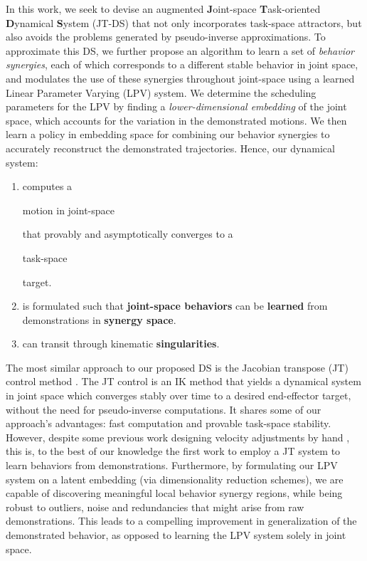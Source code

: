 \documentclass[letterpaper, 10 pt, conference,fleqn]{ieeeconf}
\begin{document}
In this work, we seek to devise an augmented \textbf{J}oint-space \textbf{T}ask-oriented \textbf{D}ynamical \textbf{S}ystem (JT-DS) that not only incorporates task-space attractors, but also avoids the problems generated by pseudo-inverse approximations. To approximate this DS, we further propose an algorithm to learn a set of \emph{behavior synergies}, each of which corresponds to a different stable behavior in joint space, and modulates the use of these synergies throughout joint-space using a learned Linear Parameter Varying (LPV) system. We determine the scheduling parameters for the LPV by finding a \emph{lower-dimensional embedding} of the joint space, which accounts for the variation in the demonstrated motions. We then learn a policy in embedding space for combining our behavior synergies to accurately reconstruct the demonstrated trajectories. 
Hence, our dynamical system:
\begin{enumerate}[leftmargin=*]
\item computes a \begin{bf}motion in joint-space\end{bf} that provably and asymptotically converges to a \begin{bf}task-space \end{bf}target.
\item is formulated such that \textbf{joint-space behaviors} can be \textbf{learned} from demonstrations in \textbf{synergy space}.
\item can transit through kinematic \textbf{singularities}.
\end{enumerate}


The most similar approach to our proposed DS is the Jacobian transpose (JT) control method \cite{wolovich1984computational} . The JT control is an IK method that yields a dynamical system in joint space
which converges stably over time to a desired end-effector target, without the need for pseudo-inverse computations. It shares some of our approach's advantages: fast computation and provable task-space stability. However, despite some previous work designing velocity adjustments by hand \cite{Shi2016}, this is, to the best of our knowledge the first work to employ a JT system to learn behaviors from demonstrations. Furthermore, by formulating our LPV system on a latent embedding (via dimensionality reduction schemes), we are capable of discovering meaningful local behavior synergy regions, while being robust to outliers, noise and redundancies that might arise from raw demonstrations. This leads to a compelling improvement in generalization of the demonstrated behavior, as opposed to learning the LPV system solely in joint space. 
\end{document}
